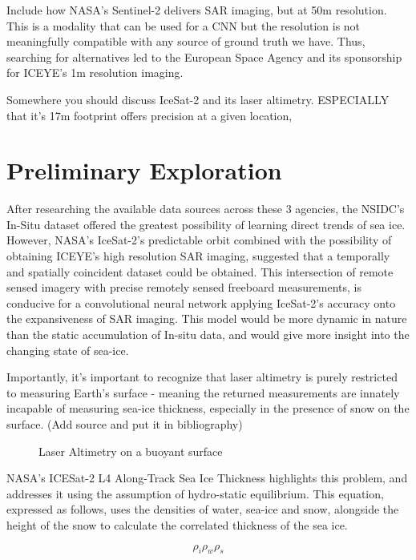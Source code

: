 Include how NASA's Sentinel-2 delivers SAR imaging, but at 50m resolution. This is a modality that can be used for a CNN but the resolution is not meaningfully compatible with any source of ground truth we have. Thus, searching for alternatives led to the European Space Agency and its sponsorship for ICEYE's 1m resolution imaging.

Somewhere you should discuss IceSat-2 and its laser altimetry. ESPECIALLY that it's 17m footprint offers precision at a given location, 

\section {Preliminary Exploration}
After researching the available data sources across these 3 agencies, the NSIDC's In-Situ dataset offered the greatest possibility of learning direct trends of sea ice. However, NASA's IceSat-2's predictable orbit combined with the possibility of obtaining ICEYE's high resolution SAR imaging, suggested that a temporally and spatially coincident dataset could be obtained. This intersection of remote sensed imagery with precise remotely sensed freeboard measurements, is conducive for a convolutional neural network applying IceSat-2's accuracy onto the expansiveness of SAR imaging. This model would be more dynamic in nature than the static accumulation of In-situ data, and would give more insight into the changing state of sea-ice. \cite{In-Situ-Dataset}

Importantly, it's important to recognize that laser altimetry is purely restricted to measuring Earth's surface - meaning the returned measurements are innately incapable of measuring sea-ice thickness, especially in the presence of snow on the surface. (Add source and put it in bibliography)
\begin{figure}[htb]
	\centering
	\caption{Laser Altimetry on a buoyant surface} \cite{ICESat-2-L4-Product}
	\label{fig:hydro-static-diagram}
\end{figure}

NASA's ICESat-2 L4 Along-Track Sea Ice Thickness highlights this problem, and addresses it using the assumption of hydro-static equilibrium. This equation, expressed as follows, uses the densities of water, sea-ice and snow, alongside the height of the snow to calculate the correlated thickness of the sea ice.

\begin{equation*}
	\rho_i
	\rho_w
	\rho_s
\end{equation*}

